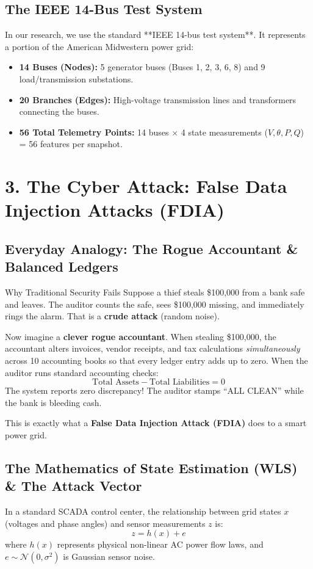 \documentclass[10pt,a4paper]{article}
\begin{document}
\subsection{The IEEE 14-Bus Test System}
In our research, we use the standard **IEEE 14-bus test system**. It represents a portion of the American Midwestern power grid:
\begin{itemize}[noitemsep]
    \item \textbf{14 Buses (Nodes):} 5 generator buses (Buses 1, 2, 3, 6, 8) and 9 load/transmission substations.
    \item \textbf{20 Branches (Edges):} High-voltage transmission lines and transformers connecting the buses.
    \item \textbf{56 Total Telemetry Points:} 14 buses $\times$ 4 state measurements ($V, \theta, P, Q$) = 56 features per snapshot.
\end{itemize}

\section{3. The Cyber Attack: False Data Injection Attacks (FDIA)}

\subsection{Everyday Analogy: The Rogue Accountant \& Balanced Ledgers}
\begin{analogybox}{Why Traditional Security Fails}
Suppose a thief steals \$100,000 from a bank safe and leaves. The auditor counts the safe, sees \$100,000 missing, and immediately rings the alarm. That is a \textbf{crude attack} (random noise).

Now imagine a \textbf{clever rogue accountant}. When stealing \$100,000, the accountant alters invoices, vendor receipts, and tax calculations \textit{simultaneously} across 10 accounting books so that every ledger entry adds up to zero. 
When the auditor runs standard accounting checks:
\[
\text{Total Assets} - \text{Total Liabilities} = 0
\]
The system reports zero discrepancy! The auditor stamps ``ALL CLEAN'' while the bank is bleeding cash.

This is exactly what a \textbf{False Data Injection Attack (FDIA)} does to a smart power grid.
\end{analogybox}

\subsection{The Mathematics of State Estimation (WLS) \& The Attack Vector}
In a standard SCADA control center, the relationship between grid states $x$ (voltages and phase angles) and sensor measurements $z$ is:
\[
z = h(x) + e
\]
where $h(x)$ represents physical non-linear AC power flow laws, and $e \sim \mathcal{N}(0, \sigma^2)$ is Gaussian sensor noise.
\end{document}
